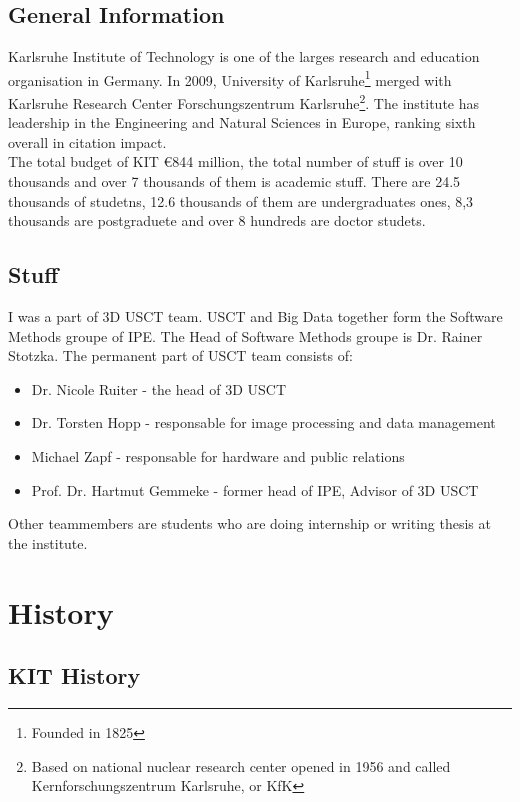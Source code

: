 \documentclass[english]{article}
\begin{document}
\subsection{General Information}

Karlsruhe Institute of Technology is one of the larges research and education organisation in Germany. In 2009, University of Karlsruhe\footnote{Founded in 1825} merged with Karlsruhe Research Center Forschungszentrum Karlsruhe\footnote{Based on national nuclear research center opened in 1956 and called Kernforschungszentrum Karlsruhe, or KfK}. The institute has leadership in the Engineering and Natural Sciences in Europe, ranking sixth overall in citation impact.\\

The total budget of KIT \euro 844 million, the total number of stuff is over 10 thousands and over 7 thousands of them is academic stuff. There are 24.5 thousands of studetns, 12.6 thousands of them are undergraduates ones, 8,3 thousands are postgraduete and over 8 hundreds are doctor studets.
\subsection{Stuff}

I was a part of 3D USCT team. USCT and Big Data together form the Software Methods groupe of IPE. The Head of Software Methods groupe is Dr. Rainer Stotzka. The permanent part of USCT team consists of:  
\begin{itemize}
\item Dr. Nicole Ruiter - the head of 3D USCT
\item Dr. Torsten Hopp - responsable for image processing and data management
\item Michael Zapf - responsable for hardware and public relations
\item Prof. Dr. Hartmut Gemmeke - former head of IPE, Advisor of 3D USCT
\end{itemize}

Other teammembers are students who are doing internship or writing thesis at the institute.

\section{History}

\subsection{KIT History}
\end{document}
